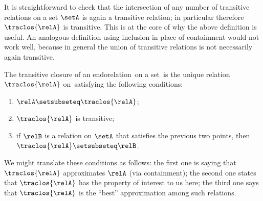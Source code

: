\begin{remark}
It is straightforward to check that the intersection of any number of transitive relations on a set $\setA$ is again a transitive relation; in particular therefore $\traclos{\relA}$ is transitive. This is at the core of why the above definition is useful. An analogous definition using inclusion in place of containment would not work well, because in general the union of transitive relations is not necessarily again transitive. 
\end{remark}

\begin{remark}
The transitive closure of an endorelation~\relA on a set~\setA is the unique relation $\traclos{\relA}$ on~\setA satisfying the following conditions:
    \begin{enumerate}
        \item $\relA \setsubseteq \traclos{\relA}$;
        \item $\traclos{\relA}$ is transitive;
        \item if $\relB$ is a relation on $\setA$ that satisfies the previous two points, then $\traclos{\relA} \setsubseteq \relB$.
    \end{enumerate}
We might translate these conditions as follows: the first one is saying that $\traclos{\relA}$ approximates $\relA$ (via containment); the second one states that $\traclos{\relA}$ has the property of interest to us here; the third one says that $\traclos{\relA}$ is the ``best'' approximation among such relations. 
\end{remark}


